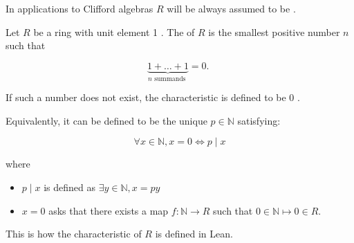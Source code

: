 \begin{remark}
    \label{mk:commutative_ring}

    In applications to Clifford algebras $R$ will be always assumed to be .
    
\end{remark}

\begin{definition}[Characteristic]
    \label{characteristic}
    \leanok

    Let $R$ be a ring with unit element 1 . The  of $R$ is the smallest positive number $n$ such that

    $$
    \underbrace{1+\ldots+1}_{n \text { summands }}=0 \text {. }
    $$
    
    If such a number does not exist, the characteristic is defined to be 0 .

\end{definition}

\begin{remark}
    \label{mk:characteristic}

    Equivalently, it can be defined to be the unique $p \in \mathbb{N}$ satisfying:

    $$
    \forall x \in \mathbb{N}, x = 0 \iff p \mid x
    $$

    where
    
    \begin{itemize}

        \item $p \mid x$ is defined as $\exists y \in \mathbb{N}, x = p y$
    
        \item $x = 0$ asks that there exists a map $f : \mathbb{N} \to R$ such that $0 \in \mathbb{N} ↦ 0 \in R$.
        
    \end{itemize}

    This is how the characteristic of $R$ is defined in Lean.

\end{remark}

